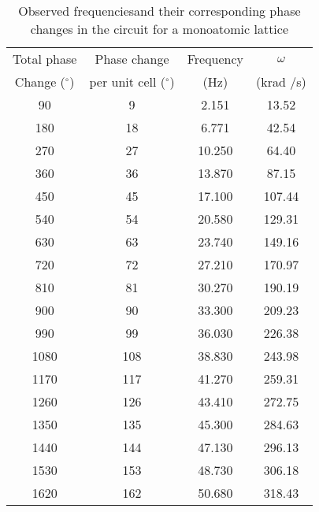 \begin{table}[]
    \centering
    \begin{tabular}{|c|c|c|c|}
    \hline
    Total phase & Phase change & Frequency & $\omega$ \\
    Change  ($^\circ$) & per unit cell ($^\circ$) & (Hz) & (krad /s) \\ \hline
    90 & 9 & 2.151 & 13.52 \\ 
    180 & 18 & 6.771 & 42.54 \\ 
    270 & 27 & 10.250 & 64.40 \\ 
    360 & 36 & 13.870 & 87.15 \\ 
    450 & 45 & 17.100 & 107.44 \\ 
    540 & 54 & 20.580 & 129.31 \\ 
    630 & 63 & 23.740 & 149.16 \\ 
    720 & 72 & 27.210 & 170.97 \\ 
    810 & 81 & 30.270 & 190.19 \\ 
    900 & 90 & 33.300 & 209.23 \\ 
    990 & 99 & 36.030 & 226.38 \\ 
    1080 & 108 & 38.830 & 243.98 \\ 
    1170 & 117 & 41.270 & 259.31 \\ 
    1260 & 126 & 43.410 & 272.75 \\ 
    1350 & 135 & 45.300 & 284.63 \\ 
    1440 & 144 & 47.130 & 296.13 \\ 
    1530 & 153 & 48.730 & 306.18 \\ 
    1620 & 162 & 50.680 & 318.43 \\ \hline
    \end{tabular}
    \caption{Observed frequenciesand their corresponding phase changes in the circuit for a monoatomic lattice}
    \label{tab:mono1}
\end{table}